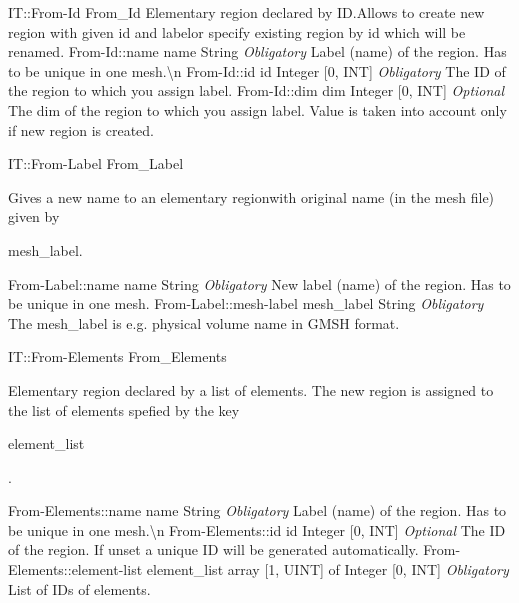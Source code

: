 \begin{RecordType}
	{IT::From-Id}
	{From{\_}Id}
	{}%
	{}%
	{{{Elementary region declared by ID.Allows to create new region with given id and labelor specify existing region by id which will be renamed.}%
}}
		\RecKey
			{From-Id::name}
			{name}
			{{String}}{}
			{ \it{Obligatory}}
			{{{Label (name) of the region.
Has to be unique in one mesh.{\textbackslash}n}%
}}
		\RecKey
			{From-Id::id}
			{id}
			{{Integer [0, INT]}}{}
			{ \it{Obligatory}}
			{{{The ID of the region to which you assign label.}%
}}
		\RecKey
			{From-Id::dim}
			{dim}
			{{Integer [0, INT]}}{}
			{ \it{Optional}}
			{{{The dim of the region to which you assign label.
Value is taken into account only if new region is created.}%
}}
\end{RecordType}
\begin{RecordType}
	{IT::From-Label}
	{From{\_}Label}
	{}%
	{}%
	{{{Gives a new name to an elementary regionwith original name (in the mesh file) given by  }\begin{ttfamily}mesh{\_}label.\end{ttfamily}%
}}
		\RecKey
			{From-Label::name}
			{name}
			{{String}}{}
			{ \it{Obligatory}}
			{{{New label (name) of the region.
Has to be unique in one mesh.}%
}}
		\RecKey
			{From-Label::mesh-label}
			{mesh{\_}label}
			{{String}}{}
			{ \it{Obligatory}}
			{{{The mesh{\_}label is e.g. physical volume name in GMSH format.}%
}}
\end{RecordType}
\begin{RecordType}
	{IT::From-Elements}
	{From{\_}Elements}
	{}%
	{}%
	{{{Elementary region declared by a list of elements.
The new region is assigned to the list of elements spefied by the key}\begin{ttfamily}element{\_}list\end{ttfamily}{.}%
}}
		\RecKey
			{From-Elements::name}
			{name}
			{{String}}{}
			{ \it{Obligatory}}
			{{{Label (name) of the region.
Has to be unique in one mesh.{\textbackslash}n}%
}}
		\RecKey
			{From-Elements::id}
			{id}
			{{Integer [0, INT]}}{}
			{ \it{Optional}}
			{{{The ID of the region.
If unset a unique ID will be generated automatically.}%
}}
		\RecKey
			{From-Elements::element-list}
			{element{\_}list}
			{{array [1, UINT] of }{Integer [0, INT]}}{}
			{ \it{Obligatory}}
			{{{List of IDs of elements.}%
}}
\end{RecordType}
